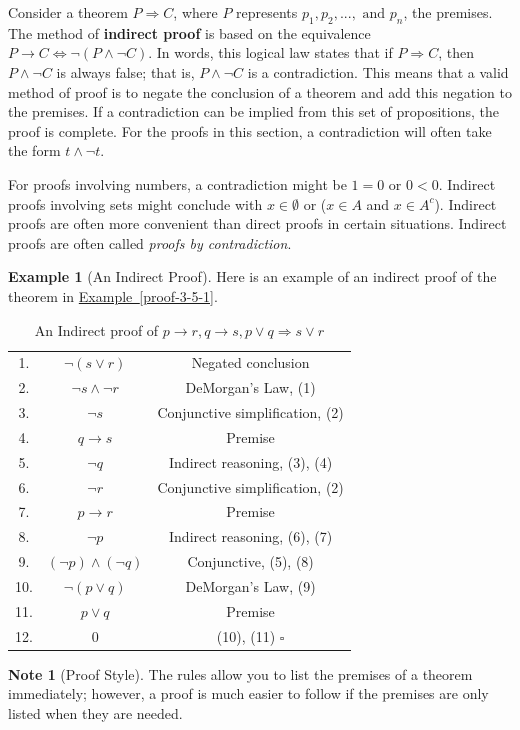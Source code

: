 \documentclass[10pt,]{book}
\newcommand{\terminology}[1]{\textbf{#1}}
\theoremstyle{plain}
\theoremstyle{definition}
\theoremstyle{definition}
\newtheorem{note}[theorem]{Note}
\theoremstyle{definition}
\newtheorem{example}[theorem]{Example}
\theoremstyle{definition}
\begin{document}
\par
Consider a theorem \(P\Rightarrow C\), where \(P\) represents \(p_1, p_2, . . . , \textrm{ and } p_n\), the premises. The method of \terminology{indirect proof} is based on the equivalence \(P\rightarrow C\Leftrightarrow \neg (P\land  \neg C)\). 
In words, this logical law states that if \(P \Rightarrow  C\), then \(P \land  \neg  C\) is always false; that is, \(P \land  \neg C\) is a contradiction. This means that a valid method of proof is to negate the conclusion of a theorem and add this negation to the premises. If a contradiction can be implied from this set of propositions, the proof is complete. For the proofs in this section, a contradiction will often take the form \(t \land \neg t\).%
\par
 For proofs involving numbers, a contradiction might be \(1 = 0\) or \(0 < 0\). Indirect proofs involving sets might conclude with \(x \in  \emptyset\) or (\(x \in  A\) and \(x \in  A^c\)). Indirect proofs are often more convenient than direct proofs in certain situations.  Indirect proofs are often called \emph{proofs by contradiction}.%
\begin{example}[An Indirect Proof]\label{ex-indirect_proof_1}
 Here is an example of an indirect proof of the theorem in \hyperref[proof-3-5-1]{Example~\ref{proof-3-5-1}}.%
\leavevmode%
\begin{table}
\centering
\begin{tabular}{ccc}
1.&\(\neg (s \lor  r)\)&  Negated conclusion\tabularnewline[0pt]
2.&\(\neg s \land  \neg r\)&  DeMorgan's Law, (1)\tabularnewline[0pt]
3.&\(\neg s\)& Conjunctive simplification, (2)\tabularnewline[0pt]
4.&\(q\to s\)&  Premise\tabularnewline[0pt]
5.&\(\neg q\)&  Indirect reasoning, (3), (4)\tabularnewline[0pt]
6.&\(\neg r\)&  Conjunctive simplification, (2)\tabularnewline[0pt]
7.&\(p \rightarrow  r\)& Premise\tabularnewline[0pt]
8.&\(\neg p\)&  Indirect reasoning, (6), (7)\tabularnewline[0pt]
9.&\((\neg p) \land  (\neg q)\)&  Conjunctive, (5), (8)\tabularnewline[0pt]
10.&\(\neg (p \lor  q)\)&DeMorgan's Law, (9)\tabularnewline[0pt]
11.&\(p \lor  q\)&Premise\tabularnewline[0pt]
12.&\(0\)&(10), (11) \(\square\)
\end{tabular}
\caption{An Indirect proof of \(p \rightarrow  r, q\rightarrow s,p\lor q\Rightarrow s\lor r\)\label{proof-indirect}}
\end{table}
\end{example}
\begin{note}[Proof Style]\label{note-1}
The rules allow you to list the premises of a theorem immediately; however, a proof is much easier to follow if the premises are only listed when they are needed.%
\end{note}
\end{document}
